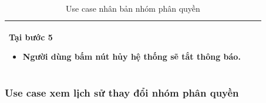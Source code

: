 \documentclass[12pt,a4paper]{article}
\begin{document}
\begin{table}[H]
\begin{tabular}{|p{3.5cm}|p{11.5cm}|c|}
            Tại bước 5\newline
            \vspace{-.8cm}\begin{itemize}
                              \item Người dùng bấm nút hủy hệ thống sẽ tắt thông báo.
            \end{itemize} \\
            \hline
        \end{tabular}
        \caption{Use case nhân bản nhóm phân quyền }
    \end{table}


    \subsubsection*{Use case xem lịch sử thay đổi nhóm phân quyền }
\end{document}

